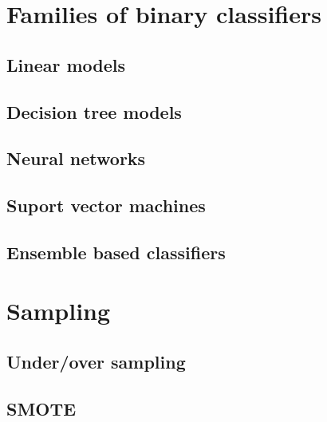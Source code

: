 \section{Families of binary classifiers}
\subsection{Linear models}
\subsection{Decision tree models}
\subsection{Neural networks}
\subsection{Suport vector machines}
\subsection{Ensemble based classifiers}
\section{Sampling}
\subsection{Under/over sampling}
\subsection{SMOTE}